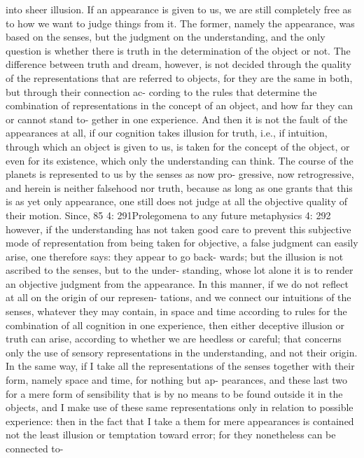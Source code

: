 into sheer illusion.
If an appearance is given to us, we are still completely free as to how
we want to judge things from it. The former, namely the appearance,
was based on the senses, but the judgment on the understanding, and
the only question is whether there is truth in the determination of the
object or not. The difference between truth and dream, however, is not
decided through the quality of the representations that are referred to
objects, for they are the same in both, but through their connection ac-
cording to the rules that determine the combination of representations
in the concept of an object, and how far they can or cannot stand to-
gether in one experience. And then it is not the fault of the appearances
at all, if our cognition takes illusion for truth, i.e., if intuition, through
which an object is given to us, is taken for the concept of the object,
or even for its existence, which only the understanding can think. The
course of the planets is represented to us by the senses as now pro-
gressive, now retrogressive, and herein is neither falsehood nor truth,
because as long as one grants that this is as yet only appearance, one
still does not judge at all the objective quality of their motion. Since,
85
4: 291Prolegomena to any future metaphysics
4: 292
however, if the understanding has not taken good care to prevent this
subjective mode of representation from being taken for objective, a false
judgment can easily arise, one therefore says: they appear to go back-
wards; but the illusion is not ascribed to the senses, but to the under-
standing, whose lot alone it is to render an objective judgment from the
appearance.
In this manner, if we do not reﬂect at all on the origin of our represen-
tations, and we connect our intuitions of the senses, whatever they may
contain, in space and time according to rules for the combination of all
cognition in one experience, then either deceptive illusion or truth can
arise, according to whether we are heedless or careful; that concerns only
the use of sensory representations in the understanding, and not their
origin. In the same way, if I take all the representations of the senses
together with their form, namely space and time, for nothing but ap-
pearances, and these last two for a mere form of sensibility that is by no
means to be found outside it in the objects, and I make use of these same
representations only in relation to possible experience: then in the fact
that I take a them for mere appearances is contained not the least illusion
or temptation toward error; for they nonetheless can be connected to-
